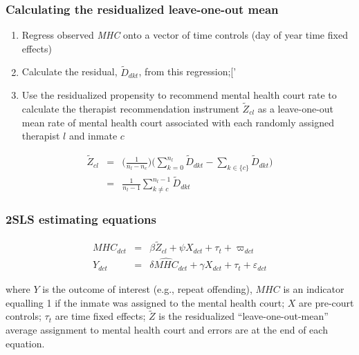 \documentclass{beamer}
\begin{document}
\begin{frame}
  \frametitle{Calculating the residualized leave-one-out mean}

  \begin{enumerate}
    \item Regress observed \emph{MHC} onto a vector of time controls (day of year time fixed effects)
    \item Calculate the residual, $\widetilde{D}_{dkt}$, from this regression;['
    \item Use the residualized propensity to recommend mental health court rate to calculate the therapist recommendation instrument $\widetilde{Z}_{cl}$ as a leave-one-out mean rate of mental health court associated with each randomly assigned therapist $l$ and inmate $c$
  \end{enumerate}

  \begin{eqnarray}
    \widetilde{Z}_{cl} &=& \bigg ( \frac{1}{n_l - n_c} \bigg ) \bigg ( \sum_{k=0}^{n_l} \widetilde{D}_{dkt} - \sum_{k \in \{ c \}} \widetilde{D}_{dkt} \bigg ) \nonumber \\
    &=& \frac{1}{n_l - 1} \sum_{k \neq c}^{n_l - 1} \widetilde{D}_{dkt}
  \end{eqnarray}

\end{frame}



\begin{frame}
  \frametitle{2SLS estimating equations}

  \begin{eqnarray}
    MHC_{dct} &=& \beta \widetilde{Z}_{cl} + \psi X_{dct} + \tau_t + \varpi_{dct} \\
    Y_{dct} &=& \delta \widehat{MHC}_{dct} + \gamma X_{dct} + \tau_t + \varepsilon_{dct}
  \end{eqnarray}

  \bigskip

  where $Y$ is the outcome of interest (e.g., repeat offending), $MHC$ is an indicator equalling 1 if the inmate was assigned to the mental health court; $X$ are pre-court controls; $\tau_t$ are time fixed effects; $\widetilde{Z}$ is the residualized ``leave-one-out-mean'' average assignment to mental health court and errors are at the end of each equation.

\end{frame}
\end{document}
